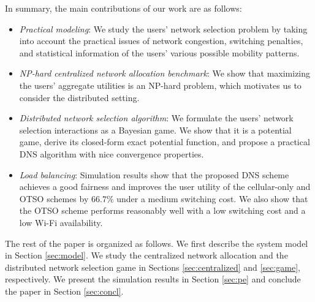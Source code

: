 \documentclass[journal]{IEEEtran}
\begin{document}
  In summary, the main contributions of our work are as follows:
%
\begin{itemize}

\item \emph{Practical modeling}: We study the users' network selection problem by taking into account the practical issues of network congestion, switching penalties, and statistical information of the users' various possible mobility patterns.

\item \emph{NP-hard centralized network allocation benchmark}: We show that maximizing the users' aggregate utilities is an NP-hard problem, which motivates us to consider the distributed setting. 

\item \emph{Distributed network selection algorithm}: We formulate the users' network selection interactions as a Bayesian game. We show that it is a potential game, derive its closed-form exact potential function, and propose a practical DNS algorithm with nice convergence properties.

\item \emph{Load balancing}: Simulation results show that the proposed DNS scheme achieves a good fairness and improves the user utility of the cellular-only and OTSO schemes by $66.7\%$ under a medium switching cost.
  We also show that the OTSO scheme performs reasonably well with a low switching cost and a low Wi-Fi availability.


\end{itemize}



  The rest of the paper is organized as follows. 
	We first describe the system model in Section \ref{sec:model}. %
  We study the centralized network allocation and the distributed network selection game in Sections \ref{sec:centralized} and \ref{sec:game}, respectively.
  We present the simulation results in Section \ref{sec:pe} and conclude the paper in Section \ref{sec:concl}.



\end{document}
